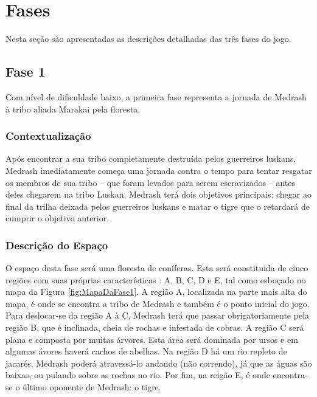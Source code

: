 \section{Fases}

Nesta seção são apresentadas as descrições detalhadas das três fases do jogo.

\subsection{Fase 1}

Com nível de dificuldade baixo, a primeira fase representa a jornada de Medrash à tribo aliada Marakai pela floresta.

\subsubsection{Contextualização}

Após encontrar a sua tribo completamente destruída pelos guerreiros luskans, Medrash imediatamente começa uma jornada contra o tempo para tentar resgatar os membros de sua tribo -- que foram levados para serem escravizados -- antes deles chegarem na tribo Luskan. Medrash terá dois objetivos principais: chegar ao final da trilha deixada pelos guerreiros luskans e matar o tigre que o retardará de cumprir o objetivo anterior.

\subsubsection{Descrição do Espaço}

O espaço desta fase será uma floresta de coníferas. Esta será constituida de cinco regiões com suas próprias características : A, B, C, D e E, tal como esboçado no mapa da Figura \ref{fig:MapaDaFase1}. A região A, localizada na parte mais alta do mapa, é onde se encontra a tribo de Medrash e também é o ponto inicial do jogo. Para deslocar-se da região A à C, Medrash terá que passar obrigatoriamente pela região B, que é inclinada, cheia de rochas e infestada de cobras. A região C será plana e composta por muitas árvores. Esta área será dominada por ursos e em algumas ávores haverá cachos de abelhas. Na região D há um rio repleto de jacarés. Medrash poderá atravessá-lo andando (não correndo), já que as águas são baixas, ou pulando sobre as rochas no rio. Por fim, na reigão E, é onde encontra-se o último oponente de Medrash: o tigre. 

